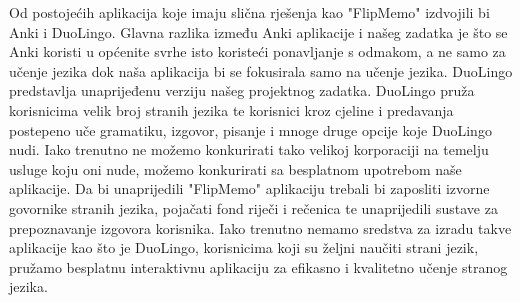 Od postojećih aplikacija koje imaju slična rješenja kao "FlipMemo" izdvojili bi Anki i DuoLingo. Glavna razlika između Anki aplikacije i našeg zadatka je što se Anki koristi u općenite svrhe isto koristeći ponavljanje s odmakom, a ne samo za učenje jezika dok naša aplikacija bi se fokusirala samo na učenje jezika. DuoLingo predstavlja unaprijeđenu verziju našeg projektnog zadatka. DuoLingo pruža korisnicima velik broj stranih jezika te korisnici kroz cjeline i predavanja postepeno uče gramatiku, izgovor, pisanje i mnoge druge opcije koje DuoLingo nudi. Iako trenutno ne možemo konkurirati tako velikoj korporaciji na temelju usluge koju oni nude, možemo konkurirati sa besplatnom upotrebom naše aplikacije. Da bi unaprijedili "FlipMemo" aplikaciju trebali bi zaposliti izvorne govornike stranih jezika, pojačati fond riječi i rečenica te unaprijedili sustave za prepoznavanje izgovora korisnika. Iako trenutno nemamo sredstva za izradu takve aplikacije kao što je DuoLingo, korisnicima koji su željni naučiti strani jezik, pružamo besplatnu interaktivnu aplikaciju za efikasno i kvalitetno učenje stranog jezika.



	
